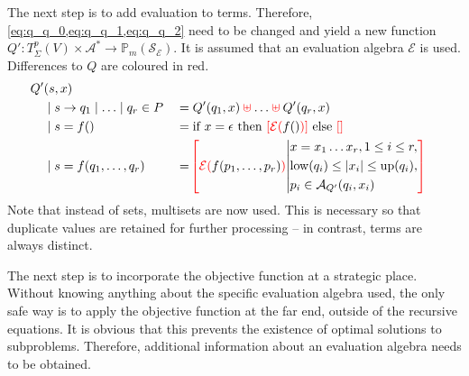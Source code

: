 \documentclass[
    a4paper,
    12pt,
    twoside,
    BCOR=12mm,
    parskip=half,
    chapterprefix,
    numbers=noenddot,
    bibliography=totoc
]{scrbook}
\begin{document}
\newpage

The next step is to add evaluation to terms. Therefore, \cref{eq:q_q_0,eq:q_q_1,eq:q_q_2} need to be changed and yield a new function $Q': T^p_\Sigma(V) \times \mathcal{A}^* \to \mathbb{P}_m(\mathcal{S}_\mathcal{E})$. It is assumed that an evaluation algebra $\mathcal{E}$ is used. Differences to $Q$ are coloured in red.
\begin{align}
	Q'&(s,x) \label{eq:q'}\\
	&\mid s \to q_1 \mid \ldots \mid q_r \in P &&= Q'(q_1,x) \mathbin{\textcolor{red}{\uplus}} \ldots \mathbin{\textcolor{red}{\uplus}} Q'(q_r,x) \nonumber \\
	&\mid s=f() &&= \text{if $x=\epsilon$ then $\textcolor{red}{[\mathcal{E}(}f()\textcolor{red}{)]}$ else $\textcolor{red}{[]}$} \nonumber \\
	&\mid s=f(q_1,\ldots,q_r) &&= \color{red} \!\left[ \color{black} \textcolor{red}{\mathcal{E}(}f(p_1,\ldots,p_r)\textcolor{red}{)} \middle\vert \color{black}
			\begin{aligned}
				&x=x_1 \ldots x_r, 1 \leq i \leq r,\\
				&\op{low}(q_i) \leq |x_i| \leq \op{up}(q_i),\\
				&p_i \in \mathcal{A}_{Q'}(q_i,x_i)
			\end{aligned}
			\color{red}\right] \nonumber
\end{align}
Note that instead of sets, multisets are now used. This is necessary so that duplicate values are retained for further processing -- in contrast, terms are always distinct.

The next step is to incorporate the objective function at a strategic place. Without knowing anything about the specific evaluation algebra used, the only safe way is to apply the objective function at the far end, outside of the recursive equations. It is obvious that this prevents the existence of optimal solutions to subproblems. Therefore, additional information about an evaluation algebra needs to be obtained.
\end{document}
